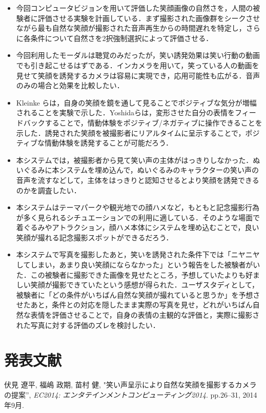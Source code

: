 \documentclass[report,10pt,uplatex,titlepage]{jsarticle}
\begin{document}
\begin{itemize}
\item 今回コンピュータビジョンを用いて評価した笑顔画像の自然さを，人間の被験者に評価させる実験を計画している．まず撮影された画像群をシークさせながら最も自然な笑顔が撮影された音声再生からの時間遅れを特定し，さらに各条件について自然さを2択強制選択によって評価させる．
\item 今回利用したモーダルは聴覚のみだったが，笑い誘発効果は笑い行動の動画でも引き起こせるはずである．インカメラを用いて，笑っている人の動画を見せて笑顔を誘発するカメラは容易に実現でき，応用可能性も広がる．音声のみの場合と効果を比較したい．
\item Kleinke らは，自身の笑顔を鏡を通して見ることでポジティブな気分が増幅されることを実験で示した\cite{kleinke1998effects}．Yoshidaらは，変形させた自分の表情をフィードバックすることで，情動体験をポジティブ/ネガティブに操作できることを示した\cite{Yoshida2013}．誘発された笑顔を被撮影者にリアルタイムに呈示することで，ポジティブな情動体験を誘発することが可能だろう．
\item 本システムでは，被撮影者から見て笑い声の主体がはっきりしなかった．ぬいぐるみに本システムを埋め込んで，ぬいぐるみのキャラクターの笑い声の音声を流すなどして，主体をはっきりと認知させるとより笑顔を誘発できるのかを調査したい．
\item 本システムはテーマパークや観光地での顔ハメなど，もともと記念撮影行為が多く見られるシチュエーションでの利用に適している．そのような場面で着ぐるみやアトラクション，顔ハメ本体にシステムを埋め込むことで，良い笑顔が撮れる記念撮影スポットができるだろう．
\item 本システムで写真を撮影したあと，笑いを誘発された条件下では「ニヤニヤしてしまい，あまり良い笑顔にならなかった」という報告をした被験者がいた．この被験者に撮影できた画像を見せたところ，予想していたよりも好ましい笑顔が撮影できていたという感想が得られた．ユーザスタディとして，被験者に「どの条件がいちばん自然な笑顔が撮れていると思うか」を予想させたあと，条件との対応を隠したまま実際の写真を見せ，どれがいちばん自然な表情を評価させることで，自身の表情の主観的な評価と，実際に撮影された写真に対する評価のズレを検討したい．
\end{itemize}


\section{発表文献}

\begingroup
\renewcommand{\section}[2]{}%
\begin{thebibliography}{9}
   伏見 遼平, 福嶋 政期, 苗村 健, "笑い声呈示により自然な笑顔を撮影するカメラの提案'', \textsl{EC2014: エンタテインメントコンピューティング2014}. pp.26--31, 2014年9月.
\textgt{[EC2014デモ発表賞 受賞(2014.9.14)]}
\end{thebibliography}
\endgroup

\break


\end{document}
